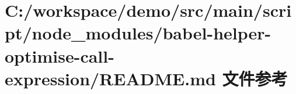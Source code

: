 \hypertarget{node__modules_2babel-helper-optimise-call-expression_2_r_e_a_d_m_e_8md}{}\section{C\+:/workspace/demo/src/main/script/node\+\_\+modules/babel-\/helper-\/optimise-\/call-\/expression/\+R\+E\+A\+D\+ME.md 文件参考}
\label{node__modules_2babel-helper-optimise-call-expression_2_r_e_a_d_m_e_8md}
